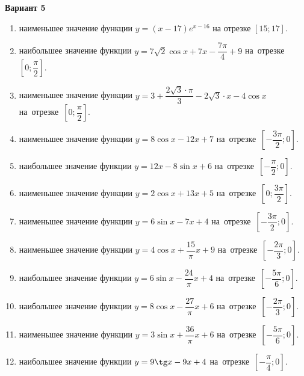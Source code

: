 \documentclass[a4paper,10pt]{article}
\begin{document}
\begin{center}\Large\textbf{Вариант 5}\end{center}

\begin{enumerate}
\item {} наименьшее значение функции $y=\left(x-17\right)e^{x-16}$ на отрезке $\left[15;17\right]$.

\item {} наибольшее значение функции $y=7\sqrt{2}\cos x+7x-\dfrac{7\pi }{4}+9$ на~отрезке~$\left[0;\dfrac{\pi }{2}\right]$.

\item {} наименьшее значение функции $y=3+\dfrac{2\sqrt{3}\cdot \pi }{3}-2\sqrt{3}\cdot x-4\cos x$ на~отрезке~$\left[0;\dfrac{\pi }{2}\right]$.

\item {} наименьшее значение функции $y=8\cos x-12x+7$ на~отрезке~$\left[-\dfrac{3\pi }{2};0\right]$.

\item {} наибольшее значение функции $y=12x-8\sin x+6$ на~отрезке~$\left[-\dfrac{\pi }{2};0\right]$.

\item {} наименьшее значение функции $y=2\cos x+13x+5$ на~отрезке~$\left[0;\dfrac{3\pi }{2}\right]$.

\item {} наименьшее значение функции $y=6\sin x-7x+4$ на~отрезке~$\left[-\dfrac{3\pi }{2};0\right]$.

\item {} наименьшее значение функции $y=4\cos x+\dfrac{15}{\pi }x+9$ на~отрезке~$\left[-\dfrac{2\pi }{3};0\right]$.

\item {} наибольшее значение функции $y=6\sin x-\dfrac{24}{\pi }x+4$ на~отрезке~$\left[-\dfrac{5\pi }{6};0\right]$.

\item {} наибольшее значение функции $y=8\cos x-\dfrac{27}{\pi }x+6$ на~отрезке~$\left[-\dfrac{2\pi }{3};0\right]$.

\item {} наименьшее значение функции $y=3\sin x+\dfrac{36}{\pi }x+6$ на~отрезке~$\left[-\dfrac{5\pi }{6};0\right]$.

\item {} наибольшее значение функции $y=9\tg x-9x+4$ на~отрезке~$\left[-\dfrac{\pi }{4};0\right]$.


\end{enumerate}
\end{document}

